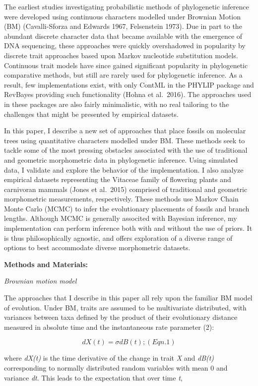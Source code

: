 \documentclass[12pt]{article}
\begin{document}
The earliest studies investigating probabilistic methods of phylogenetic
inference were developed using continuous characters modelled under
Brownian Motion (BM) (Cavalli-Sforza and Edwards 1967, Felsenstein
1973). Due in part to the abundant discrete character data that became
available with the emergence of DNA sequencing, these approaches were
quickly overshadowed in popularity by discrete trait approaches based
upon Markov nucleotide substitution models. Continuous trait models have
since gained significant popularity in phylogenetic comparative methods,
but still are rarely used for phylogenetic inference. As a result, few
implementations exist, with only ContML in the PHYLIP package and
RevBayes providing such functionality (Hohna et al.~2016). The
approaches used in these packages are also fairly minimalistic, with no
real tailoring to the challenges that might be presented by empirical
datasets.

In this paper, I describe a new set of approaches that place fossils on
molecular trees using quantitative characters modelled under BM. These
methods seek to tackle some of the most pressing obstacles associated
with the use of traditional and geometric morphometric data in
phylogenetic inference. Using simulated data, I validate and explore the
behavior of the implementation. I also analyze empirical datasets
representing the Vitaceae family of flowering plants and carnivoran
mammals (Jones et al.~2015) comprised of traditional and geometric
morphometric measurements, respectively. These methods use Markov Chain
Monte Carlo (MCMC) to infer the evolutionary placements of fossils and
branch lengths. Although MCMC is generally associted with Bayesian
inference, my implementation can perform inference both with and without
the use of priors. It is thus philosophically agnostic, and offers
exploration of a diverse range of options to best accommodate diverse
morphometric datasets.

\textbf{Methods and Materials:}

\emph{Brownian motion model}

The approaches that I describe in this paper all rely upon the familiar
BM model of evolution. Under BM, traits are assumed to be multivariate
distributed, with variances between taxa defined by the product of their
evolutionary distance measured in absolute time and the instantaneous
rate parameter (2):

\[ dX(t) = \sigma dB(t); (Eqn. 1) \]

where \emph{dX(t)} is the time derivative of the change in trait
\emph{X} and \emph{dB(t)} corresponding to normally distributed random
variables with mean 0 and variance \emph{dt}. This leads to the
expectation that over time \emph{t},
\end{document}
